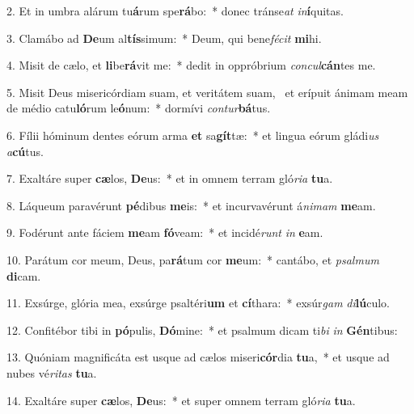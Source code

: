 2. Et in umbra alárum tu\textbf{á}rum spe\textbf{rá}bo:~*  donec tránse\textit{at} \textit{in}\textbf{í}quitas.\

3. Clamábo ad \textbf{De}um al\textbf{tís}simum:~*  Deum, qui bene\textit{fé}\textit{cit} \textbf{mi}hi.\

4. Misit de cælo, et \textbf{li}be\textbf{rá}vit me:~*  dedit in oppróbrium \textit{con}\textit{cul}\textbf{cán}tes me.\

5. Misit Deus misericórdiam suam, et veritátem suam, \dag\  et erípuit ánimam meam de médio catu\textbf{ló}rum le\textbf{ó}num:~*  dormívi \textit{con}\textit{tur}\textbf{bá}tus.\

6. Fílii hóminum dentes eórum arma \textbf{et} sa\textbf{gít}tæ:~*  et lingua eórum gládi\textit{us} \textit{a}\textbf{cú}tus.\

7. Exaltáre super \textbf{cæ}los, \textbf{De}us:~*  et in omnem terram gló\textit{ri}\textit{a} \textbf{tu}a.\

8. Láqueum paravérunt \textbf{pé}dibus \textbf{me}is:~*  et incurvavérunt á\textit{ni}\textit{mam} \textbf{me}am.\

9. Fodérunt ante fáciem \textbf{me}am \textbf{fó}veam:~*  et incidé\textit{runt} \textit{in} \textbf{e}am.\

10. Parátum cor meum, Deus, pa\textbf{rá}tum cor \textbf{me}um:~*  cantábo, et \textit{psal}\textit{mum} \textbf{di}cam.\

11. Exsúrge, glória mea, exsúrge psaltéri\textbf{um} et \textbf{cí}thara:~*  exsúr\textit{gam} \textit{di}\textbf{lú}culo.\

12. Confitébor tibi in \textbf{pó}pulis, \textbf{Dó}mine:~*  et psalmum dicam ti\textit{bi} \textit{in} \textbf{Gén}tibus:\

13. Quóniam magnificáta est usque ad cælos miseri\textbf{cór}dia \textbf{tu}a,~*  et usque ad nubes vé\textit{ri}\textit{tas} \textbf{tu}a.\

14. Exaltáre super \textbf{cæ}los, \textbf{De}us:~*  et super omnem terram gló\textit{ri}\textit{a} \textbf{tu}a.\

